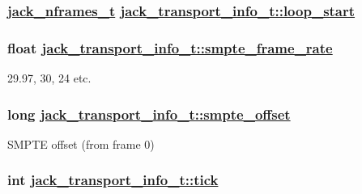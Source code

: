 \hypertarget{structjack__transport__info__t_f992fbfb657288cf1292dd591df8fcd5}{
\subsubsection[loop\_\-start]{\setlength{\rightskip}{0pt plus 5cm}\hyperlink{types_8h_fe9972a13782c1e282747fdb4bc46f9c}{jack\_\-nframes\_\-t} \hyperlink{structjack__transport__info__t_f992fbfb657288cf1292dd591df8fcd5}{jack\_\-transport\_\-info\_\-t::loop\_\-start}}}
\label{structjack__transport__info__t_f992fbfb657288cf1292dd591df8fcd5}


\hypertarget{structjack__transport__info__t_5bf07b5a4d5c0c7d64d3d92910f2af31}{
\subsubsection[smpte\_\-frame\_\-rate]{\setlength{\rightskip}{0pt plus 5cm}float \hyperlink{structjack__transport__info__t_5bf07b5a4d5c0c7d64d3d92910f2af31}{jack\_\-transport\_\-info\_\-t::smpte\_\-frame\_\-rate}}}
\label{structjack__transport__info__t_5bf07b5a4d5c0c7d64d3d92910f2af31}


29.97, 30, 24 etc. \hypertarget{structjack__transport__info__t_3fb2f2def734ead6b273a86f1d961c72}{
\subsubsection[smpte\_\-offset]{\setlength{\rightskip}{0pt plus 5cm}long \hyperlink{structjack__transport__info__t_3fb2f2def734ead6b273a86f1d961c72}{jack\_\-transport\_\-info\_\-t::smpte\_\-offset}}}
\label{structjack__transport__info__t_3fb2f2def734ead6b273a86f1d961c72}


SMPTE offset (from frame 0) \hypertarget{structjack__transport__info__t_e5e5c0754f1e26bf915455e21cf2eba5}{
\subsubsection[tick]{\setlength{\rightskip}{0pt plus 5cm}int \hyperlink{structjack__transport__info__t_e5e5c0754f1e26bf915455e21cf2eba5}{jack\_\-transport\_\-info\_\-t::tick}}}
\label{structjack__transport__info__t_e5e5c0754f1e26bf915455e21cf2eba5}


